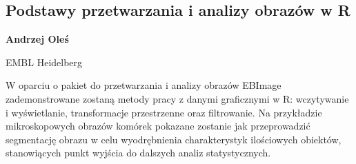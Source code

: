\documentclass[\main/boa.tex]{subfiles}
\begin{document}
\subsection{Podstawy przetwarzania i analizy obrazów w R }

\begin{minipage}{0.915\textwidth}
	\centering
  {\bf {} Andrzej Oleś}
\end{minipage}

\vskip 0.3cm

\begin{affiliations}
\begin{minipage}{0.915\textwidth}
\centering
EMBL Heidelberg \\[-2pt]
\end{minipage}
\end{affiliations}

\vskip 0.8cm

W oparciu o pakiet do przetwarzania i analizy obrazów EBImage zademonstrowane zostaną metody pracy z danymi graficznymi w R: wczytywanie i wyświetlanie, transformacje przestrzenne oraz filtrowanie. Na przykładzie mikroskopowych obrazów komórek pokazane zostanie jak przeprowadzić segmentację obrazu w celu wyodrębnienia charakterystyk ilościowych obiektów, stanowiących punkt wyjścia do dalszych analiz statystycznych. 
\end{document}
